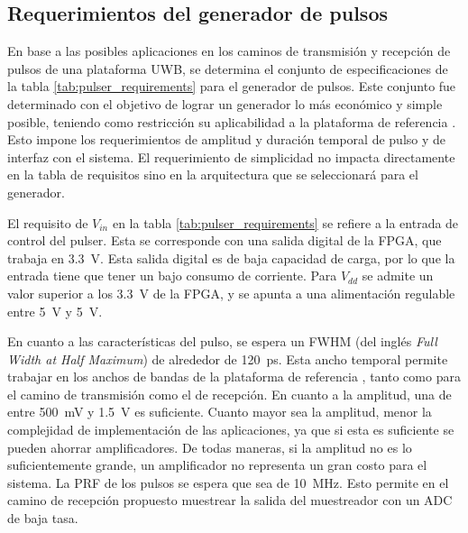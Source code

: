 \subsection{Requerimientos del generador de pulsos}

En base a las posibles aplicaciones en los caminos de transmisión y recepción de
pulsos de una plataforma UWB, se determina el conjunto de
especificaciones de la tabla \ref{tab:pulser_requirements} para el generador de
pulsos. Este conjunto fue determinado con el objetivo de lograr un generador lo
más económico y simple posible, teniendo como restricción su aplicabilidad a la
plataforma de referencia \cite{Altieri2021}. Esto impone los requerimientos de
amplitud y duración temporal de pulso y de interfaz con el sistema. El
requerimiento de simplicidad no impacta directamente en la tabla de requisitos
sino en la arquitectura que se seleccionará para el generador.

El requisito de $V_{in}$ en la tabla \ref{tab:pulser_requirements} se refiere a
la entrada de control del pulser. Esta se corresponde con una salida digital de
la FPGA, que trabaja en \qty{3.3}{\volt}.  Esta salida digital es de baja
capacidad de carga, por lo que la entrada tiene que tener un bajo consumo de
corriente. Para $V_{dd}$ se admite un valor superior a los \qty{3.3}{\volt} de
la FPGA, y se apunta a una alimentación regulable entre \qty{5}{\volt} y
\qty{5}{\volt}.

En cuanto a las características del pulso, se espera un FWHM (del inglés
\textit{Full Width at Half Maximum}) de alrededor de \qty{120}{\pico\second}.
Esta ancho temporal permite trabajar en los anchos de bandas de la plataforma de
referencia \cite{Altieri2021}, tanto como para el camino de transmisión como el
de recepción. En cuanto a la amplitud, una de entre \qty{500}{\milli\volt} y
\qty{1.5}{\volt} es suficiente. Cuanto mayor sea la amplitud, menor la
complejidad de implementación de las aplicaciones, ya que si esta es suficiente
se pueden ahorrar amplificadores. De todas maneras, si la amplitud no es lo
suficientemente grande, un amplificador no representa un gran costo para el
sistema. La PRF de los pulsos se espera que sea de \qty{10}{\mega\hertz}. Esto
permite en el camino de recepción propuesto muestrear la salida del muestreador
con un ADC de baja tasa.

